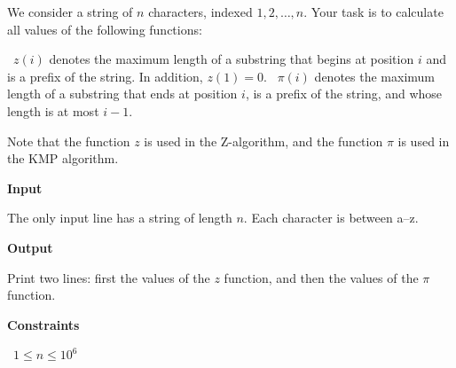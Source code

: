 We consider a string of $n$ characters, indexed $1,2,\dots,n$. Your task is to calculate all values of the following functions:

\textbullet\ $z(i)$ denotes the maximum length of a substring that begins at position $i$ and is a prefix of the string. In addition, $z(1)=0$.
\textbullet\ $\pi(i)$ denotes the maximum length of a substring that ends at position $i$, is a prefix of the string, and whose length is at most $i-1$.

Note that the function $z$ is used in the Z-algorithm, and the function $\pi$ is used in the KMP algorithm.

\vspace{0.3cm}\noindent\textbf{Input}

The only input line has a string of length $n$. Each character is between a–z.

\vspace{0.3cm}\noindent\textbf{Output}

Print two lines: first the values of the $z$ function, and then the values of the $\pi$ function.

\vspace{0.3cm}\noindent\textbf{Constraints}

\textbullet\ $1 \le n \le 10^6$